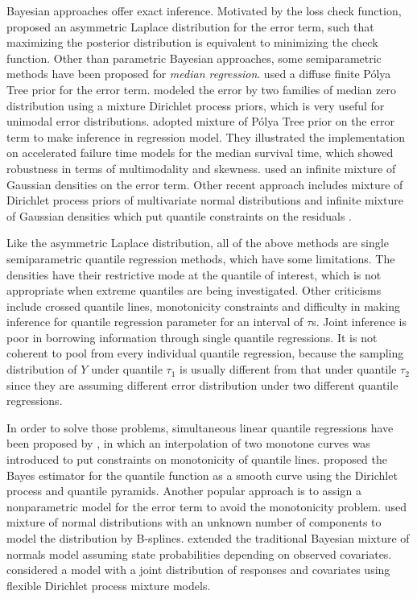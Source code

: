 \documentclass[12pt]{article}
\newcommand{\polya}{P\'{o}lya}
\begin{document}
Bayesian approaches offer exact inference. Motivated by the loss check
function, \citet{yu2001} proposed an asymmetric Laplace distribution
for the error term, such that maximizing the posterior distribution is
equivalent to minimizing the check function. Other than parametric
Bayesian approaches, some semiparametric methods have been proposed
for {\em median regression}. \citet{walker1999} used a diffuse finite
\polya{} Tree prior for the error term. \citet{kottas2001} modeled the
error by two families of median zero distribution using a mixture
Dirichlet process priors, which is very useful for unimodal error
distributions. \citet{hanson2002} adopted mixture of \polya{} Tree
prior on the error term to make inference in regression model. They
illustrated the implementation on accelerated failure time models for the median survival
time, which showed robustness in terms of multimodality
and skewness.  \citet{reich2010} used an infinite mixture of Gaussian
densities on the error term.
Other recent approach includes mixture of Dirichlet process priors of multivariate normal distributions and infinite mixture of Gaussian densities which put quantile constraints on the residuals \citep{kottas2009}.

Like the asymmetric Laplace distribution, all of the above methods are single semiparametric quantile regression methods, which have some limitations.
The densities have their restrictive mode at the quantile of interest, which is not appropriate when extreme quantiles are being investigated.
Other criticisms include crossed quantile lines, monotonicity constraints and difficulty in making inference for quantile regression parameter for an interval of $\tau$s.
Joint inference is poor in borrowing information through single quantile regressions.
It is not coherent to pool from every individual quantile regression, because the sampling distribution of $Y$ under quantile $\tau_1$ is usually different from that under quantile $\tau_2$ since they are assuming different error distribution under two different quantile regressions.

In order to solve those problems, simultaneous linear quantile regressions have been proposed by \citet{tokdar2011},
in which an interpolation of two monotone curves was introduced to put constraints on monotonicity of quantile lines.
\citet{hjort2007, hjort2009} proposed the Bayes estimator for the quantile function as a smooth curve using the Dirichlet process and quantile pyramids.
Another popular approach is to assign a nonparametric model for the error term to
avoid the monotonicity problem.
\citet{scaccia2003} used mixture of normal distributions with an unknown number of components to model the distribution by B-splines.
\citet{geweke2007} extended the traditional Bayesian mixture of normals model assuming state probabilities depending on observed covariates.
\citet{taddy2010} considered a model with a joint distribution of responses and covariates using flexible Dirichlet process mixture models.
\end{document}
